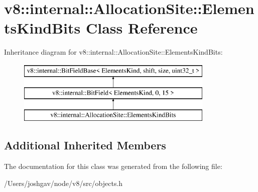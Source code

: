 \hypertarget{classv8_1_1internal_1_1_allocation_site_1_1_elements_kind_bits}{}\section{v8\+:\+:internal\+:\+:Allocation\+Site\+:\+:Elements\+Kind\+Bits Class Reference}
\label{classv8_1_1internal_1_1_allocation_site_1_1_elements_kind_bits}
Inheritance diagram for v8\+:\+:internal\+:\+:Allocation\+Site\+:\+:Elements\+Kind\+Bits\+:\begin{figure}[H]
\begin{center}
\leavevmode
\includegraphics[height=3.000000cm]{classv8_1_1internal_1_1_allocation_site_1_1_elements_kind_bits}
\end{center}
\end{figure}
\subsection*{Additional Inherited Members}


The documentation for this class was generated from the following file\+:\begin{DoxyCompactItemize}
\item 
/\+Users/joshgav/node/v8/src/objects.\+h\end{DoxyCompactItemize}
